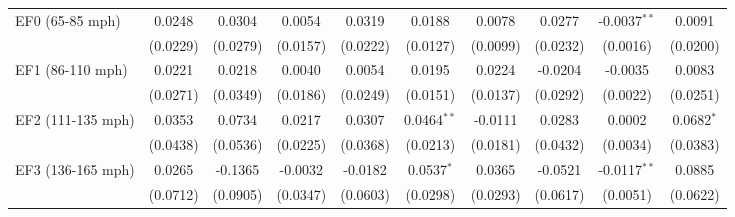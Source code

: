 \documentclass[letterpaper]{article}
\begin{document}
\begin{table}[H]
{\begin{tabular}{lccccccccc}
  EF0 (65-85 mph)      & 0.0248                         & 0.0304                        & 0.0054                          & 0.0319                          & 0.0188                    & 0.0078                        & 0.0277                   & -0.0037$^{**}$          & 0.0091\\   
                        & (0.0229)                       & (0.0279)                      & (0.0157)                        & (0.0222)                        & (0.0127)                  & (0.0099)                      & (0.0232)                 & (0.0016)                & (0.0200)\\   
   EF1 (86-110 mph)       & 0.0221                         & 0.0218                        & 0.0040                          & 0.0054                          & 0.0195                    & 0.0224                        & -0.0204                  & -0.0035                 & 0.0083\\   
                        & (0.0271)                       & (0.0349)                      & (0.0186)                        & (0.0249)                        & (0.0151)                  & (0.0137)                      & (0.0292)                 & (0.0022)                & (0.0251)\\   
   EF2 (111-135 mph)      & 0.0353                         & 0.0734                        & 0.0217                          & 0.0307                          & 0.0464$^{**}$             & -0.0111                       & 0.0283                   & 0.0002                  & 0.0682$^{*}$\\   
                        & (0.0438)                       & (0.0536)                      & (0.0225)                        & (0.0368)                        & (0.0213)                  & (0.0181)                      & (0.0432)                 & (0.0034)                & (0.0383)\\   
   EF3 (136-165 mph)       & 0.0265                         & -0.1365                       & -0.0032                         & -0.0182                         & 0.0537$^{*}$              & 0.0365                        & -0.0521                  & -0.0117$^{**}$          & 0.0885\\   
                        & (0.0712)                       & (0.0905)                      & (0.0347)                        & (0.0603)                        & (0.0298)                  & (0.0293)                      & (0.0617)                 & (0.0051)                & (0.0622)\\   

\end{tabular}}
\end{table}
\end{document}
